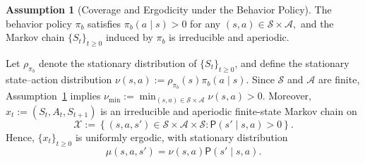 \documentclass[11pt,letterpaper]{article}
\theoremstyle{plain}
\theoremstyle{definition}
\newtheorem{assumption}{Assumption}
\theoremstyle{remark}
\begin{document}
\begin{assumption}[Coverage and Ergodicity under the Behavior Policy]
\label{assumption:MC}
The behavior policy \(\pi_b\) satisfies $\pi_b(a\mid s)>0$ for any $(s,a)\in\mathcal S\times\mathcal A,$ and the Markov chain \(\{S_t\}_{t\geq0}\) induced by \(\pi_b\) is irreducible
and aperiodic.
\end{assumption}

Let \(\rho_{\pi_b}\) denote the stationary distribution of
\(\{S_t\}_{t\ge0}\), and define the stationary state--action distribution $\nu(s,a)
    :=
    \rho_{\pi_b}(s)\pi_b(a\mid s).$ Since \(\mathcal S\) and \(\mathcal A\) are finite,
Assumption~\ref{assumption:MC} implies $\nu_{\min}
    :=
    \min_{(s,a)\in\mathcal S\times\mathcal A}\nu(s,a)
    >0.$ Moreover, $x_t:=(S_t,A_t,S_{t+1})$
is an irreducible and aperiodic finite-state Markov chain on
\[
    \mathcal X
    :=
    \left\{
        (s,a,s')\in\mathcal S\times\mathcal A\times\mathcal S:
        \mathsf P(s'\mid s,a)>0
    \right\}.
\]
Hence, \(\{x_t\}_{t\ge0}\) is uniformly ergodic, with stationary distribution
\[
    \mu(s,a,s')
    =
    \nu(s,a)\mathsf P(s'\mid s,a).
\]
\end{document}
